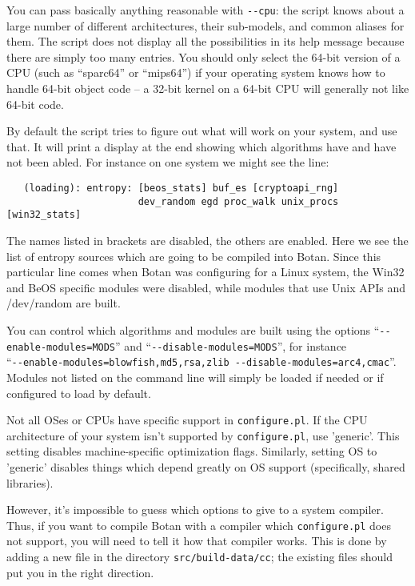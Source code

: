 \documentclass{article}
\newcommand{\filename}[1]{\texttt{#1}}
\begin{document}
You can pass basically anything reasonable with \verb|--cpu|: the
script knows about a large number of different architectures, their
sub-models, and common aliases for them. The script does not display
all the possibilities in its help message because there are simply too
many entries. You should only select the 64-bit version of a CPU (such
as ``sparc64'' or ``mips64'') if your operating system knows how to
handle 64-bit object code -- a 32-bit kernel on a 64-bit CPU will
generally not like 64-bit code.

By default the script tries to figure out what will work on your
system, and use that. It will print a display at the end showing
which algorithms have and have not been abled. For instance on one
system we might see the line:

\begin{verbatim}
   (loading): entropy: [beos_stats] buf_es [cryptoapi_rng]
                       dev_random egd proc_walk unix_procs [win32_stats]
\end{verbatim}

The names listed in brackets are disabled, the others are
enabled. Here we see the list of entropy sources which are going to be
compiled into Botan. Since this particular line comes when Botan was
configuring for a Linux system, the Win32 and BeOS specific modules
were disabled, while modules that use Unix APIs and /dev/random are
built.

You can control which algorithms and modules are built using the
options ``\verb|--enable-modules=MODS|'' and
``\verb|--disable-modules=MODS|'', for instance \\
``\verb|--enable-modules=blowfish,md5,rsa,zlib --disable-modules=arc4,cmac|''.
Modules not listed on the command line will simply be loaded if needed
or if configured to load by default.

Not all OSes or CPUs have specific support in
\filename{configure.pl}. If the CPU architecture of your system isn't
supported by \filename{configure.pl}, use 'generic'. This setting
disables machine-specific optimization flags. Similarly, setting OS to
'generic' disables things which depend greatly on OS support
(specifically, shared libraries).

However, it's impossible to guess which options to give to a system
compiler.  Thus, if you want to compile Botan with a compiler which
\filename{configure.pl} does not support, you will need to tell it how
that compiler works. This is done by adding a new file in the
directory \filename{src/build-data/cc}; the existing files should put you
in the right direction.
\end{document}
